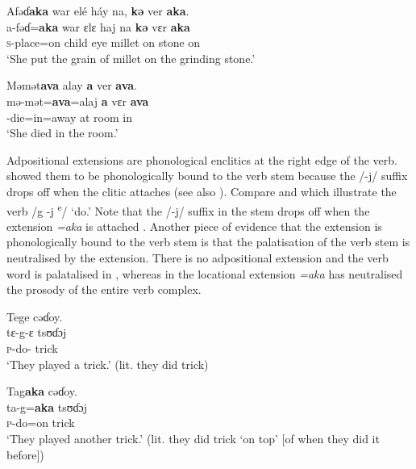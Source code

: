 \ea\label{ex:7:92}
Afəɗ\textbf{aka}  war  elé  háy  na,  \textbf{kə}  ver  \textbf{aka}.\\
\gll  a-fəɗ=\textbf{aka}  war  ɛlɛ  haj  na  \textbf{kə}  vɛr  \textbf{aka}\\
      \textsc{s}-place=on  child  eye  millet  {\PSP}  on  stone  on\\
\glt  ‘She put the grain of millet on the grinding stone.’\\
\z 

\ea\label{ex:7:93}
Məmət\textbf{ava}  alay  \textbf{a}  ver  \textbf{ava}.\\
\gll  mə-mət=\textbf{ava}=alaj  \textbf{a}   vɛr   \textbf{ava}\\
      {\NOM}-die=in=away  at  room  in\\
\glt  ‘She died in the room.’\\
\z 

Adpositional extensions are phonological enclitics at the right edge of the verb.  \citet{FriesenMamalis2008} showed them to be phonologically bound to the verb stem because the /-j/ suffix drops off when the clitic attaches  (see also ). Compare  and  which illustrate the verb /g -j \textsuperscript{e}/ ‘do.’ Note that the /-j/ suffix in the stem drops off when the extension \textit{=aka} is attached . Another piece of evidence that the extension is phonologically bound to the verb stem is that the palatisation of the verb stem is neutralised by the extension. There is no adpositional extension and the verb word is palatalised in , whereas in  the locational extension\textit{ =aka }has neutralised the prosody of the entire verb complex.

\ea\label{ex:7:94}
Tege  cəɗoy.\\
\gll  tɛ-g-ɛ  tsʊɗɔj\\
      \textsc{p}-do-{\CL}  trick\\
\glt  ‘They played a trick.' (lit. they did trick)\\
\z 

\ea\label{ex:7:95}
Tag\textbf{aka}  cəɗoy.\\
\gll  ta-g=\textbf{aka}   tsʊɗɔj\\
      \textsc{p}-do=on   trick\\
\glt  ‘They played another trick.’ (lit. they did trick ‘on top’ [of when they did it before])\\
\z 

